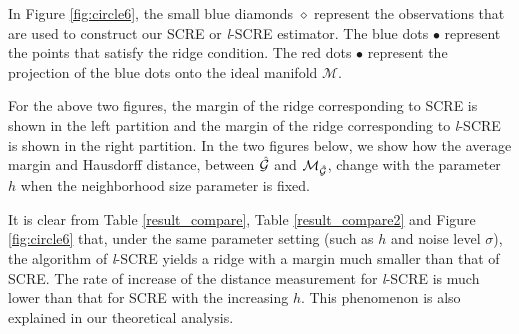 \documentclass[aos,preprint]{imsart}
\theoremstyle{remark}
\begin{document}
In Figure \ref{fig:circle6}, the small blue diamonds $\diamond$ represent the observations that are used to construct our SCRE or {\it l}-SCRE estimator. The blue dots $\bullet$ represent the points that satisfy the ridge condition. The red dots $\bullet$ represent the projection of the blue dots onto the ideal manifold ${\mathcal M}$.

For the above two figures, the margin of the ridge corresponding to SCRE is shown in the left partition and the margin of the ridge corresponding to {\it l}-SCRE is shown in the right partition.
In the two figures below, we show how the average margin and Hausdorff distance, between $\cal \hat{G}$ and ${\cal M}_{\cal \hat{G}}$, change with the parameter $h$ when the neighborhood size parameter is fixed.


It is clear from Table \ref{result_compare}, Table \ref{result_compare2} and Figure \ref{fig:circle6} that, under the same parameter setting (such as $h$ and noise level $\sigma$), the algorithm of {\it l}-SCRE yields a ridge with a margin much smaller than that of SCRE. The rate of increase of the distance measurement for {\it l}-SCRE is much lower than that for SCRE with the increasing $h$. This phenomenon is also explained in our theoretical analysis.
\end{document}
